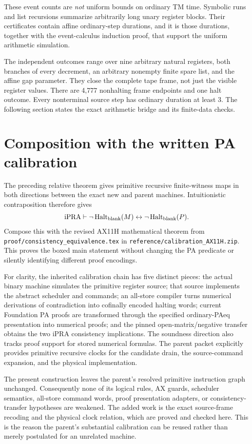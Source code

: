 \documentclass[11pt,a4paper]{article}
\theoremstyle{definition}
\newcommand{\ipra}{\mathrm{iPRA}}
\newcommand{\Halt}{\operatorname{Halt}}
\newcommand{\file}[1]{\nolinkurl{#1}}
\begin{document}
These event counts are \emph{not} uniform bounds on ordinary TM time.
Symbolic runs and list recursions summarize arbitrarily long unary
register blocks. Their certificates contain affine ordinary-step
durations, and it is those durations, together with the event-calculus
induction proof, that support the uniform arithmetic simulation.

The independent outcomes range over nine arbitrary natural registers,
both branches of every decrement, an arbitrary nonempty finite spare
list, and the affine gap parameter. They close the complete tape frame,
not just the visible register values. There are 4,777 nonhalting frame
endpoints and one halt outcome. Every nonterminal source step has
ordinary duration at least 3. The following section states the exact
arithmetic bridge and its finite-data checks.



\section{Composition with the written PA calibration}

The preceding relative theorem gives primitive recursive finite-witness
maps in both directions between the exact new and parent machines.
Intuitionistic contraposition therefore gives
\[
 \ipra\vdash\neg\Halt_{\rm blank}(M)
                \leftrightarrow\neg\Halt_{\rm blank}(P).
\]
Compose this with the revised AX11H mathematical theorem from
\file{proof/consistency_equivalence.tex} in
\file{reference/calibration_AX11H.zip}. This proves the boxed main
statement without changing the PA predicate or silently identifying
different proof encodings.

For clarity, the inherited calibration chain has five distinct pieces:
the actual binary machine simulates the primitive register source;
that source implements the abstract scheduler and commands; an all-store
compiler turns numerical derivations of contradiction into cofinally
encoded halting words; current Foundation PA proofs are transformed
through the specified ordinary-PAeq presentation into numerical proofs;
and the pinned open-matrix/negative transfer obtains the two $\ipra$
consistency implications. The soundness direction also tracks proof
support for stored numerical formulas. The parent packet explicitly
provides primitive recursive clocks for the candidate drain, the
source-command expansion, and the physical implementation.

The present construction leaves the parent's resolved primitive
instruction graph unchanged. Consequently none of its logical rules,
AX guards, scheduler semantics, all-store command words, proof
presentation adapters, or consistency-transfer hypotheses are weakened.
The added work is the exact source-frame recoding and the physical
clock relation, which are proved and checked here. This is the reason
the parent's substantial calibration can be reused rather than merely
postulated for an unrelated machine.
\end{document}
